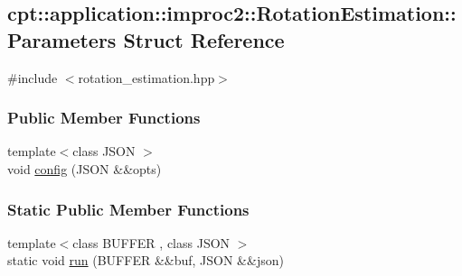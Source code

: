 \hypertarget{structcpt_1_1application_1_1improc2_1_1_rotation_estimation_1_1_parameters}{\subsection{cpt\-:\-:application\-:\-:improc2\-:\-:Rotation\-Estimation\-:\-:Parameters Struct Reference}
\label{structcpt_1_1application_1_1improc2_1_1_rotation_estimation_1_1_parameters}
}


{\ttfamily \#include $<$rotation\-\_\-estimation.\-hpp$>$}

\subsubsection*{Public Member Functions}
\begin{DoxyCompactItemize}
\item 
{\footnotesize template$<$class J\-S\-O\-N $>$ }\\void \hyperlink{structcpt_1_1application_1_1improc2_1_1_rotation_estimation_1_1_parameters_a50e1e07edd73e33e7b39cc95c275252c}{config} (J\-S\-O\-N \&\&opts)
\end{DoxyCompactItemize}
\subsubsection*{Static Public Member Functions}
\begin{DoxyCompactItemize}
\item 
{\footnotesize template$<$class B\-U\-F\-F\-E\-R , class J\-S\-O\-N $>$ }\\static void \hyperlink{structcpt_1_1application_1_1improc2_1_1_rotation_estimation_1_1_parameters_a14e98b0f05e3e223a258a05e3917fde4}{run} (B\-U\-F\-F\-E\-R \&\&buf, J\-S\-O\-N \&\&json)
\end{DoxyCompactItemize}
